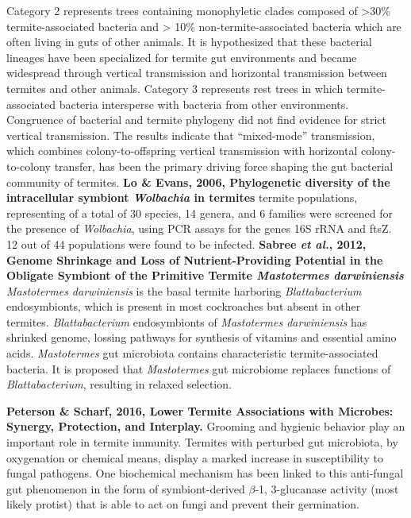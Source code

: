 \documentclass[11pt]{article}
\begin{document}
\begin{sloppypar}
Category 2 represents trees containing monophyletic clades composed of >30\% termite-associated bacteria and > 10\% non-termite-associated bacteria which are often living in guts of other animals. 
It is hypothesized that these bacterial lineages have been specialized for termite gut environments and became widespread through vertical transmission and horizontal transmission between termites and other animals. 
Category 3 represents rest trees in which termite-associated bacteria intersperse with bacteria from other environments. 
Congruence of bacterial and termite phylogeny did not find evidence for strict vertical transmission. 
The results indicate that “mixed-mode” transmission, which combines colony-to-offspring vertical transmission with horizontal colony-to-colony transfer, has been the primary driving force shaping the gut bacterial community of termites.
\textbf{Lo & Evans, 2006, Phylogenetic diversity of the intracellular symbiont \textit{Wolbachia} in termites}   termite populations, representing of a total of 30 species, 14 genera, and 6 families were screened for the presence of \textit{Wolbachia}, using PCR assays for the genes 16S rRNA and ftsZ. 
12 out of 44 populations were found to be infected. 
\textbf{Sabree \textit{et al.}, 2012, Genome Shrinkage and Loss of Nutrient-Providing Potential in the Obligate Symbiont of the Primitive Termite \textit{Mastotermes darwiniensis}} \newline
\textit{Mastotermes darwiniensis} is the basal termite harboring \textit{Blattabacterium} endosymbionts, which is present in most cockroaches but absent in other termites. 
\textit{Blattabacterium} endosymbionts of \textit{Mastotermes darwiniensis} has shrinked genome, lossing pathways for synthesis of vitamins and essential amino acids. 
\textit{Mastotermes} gut microbiota contains characteristic termite-associated bacteria.
It is proposed that \textit{Mastotermes} gut microbiome replaces functions of \textit{Blattabacterium}, resulting in relaxed selection.
\par
\textbf{Peterson & Scharf, 2016, Lower Termite Associations with Microbes: Synergy, Protection, and Interplay.} \newline
Grooming and hygienic behavior play an important role in termite immunity. 
Termites with perturbed gut microbiota, by oxygenation or chemical means, display a marked increase in susceptibility to fungal pathogens. 
One biochemical mechanism has been linked to this anti-fungal gut phenomenon in the form of symbiont-derived $\beta$-1, 3-glucanase activity (most likely protist) that is able to act on fungi and prevent their germination. 

\end{sloppypar}
\end{document}
